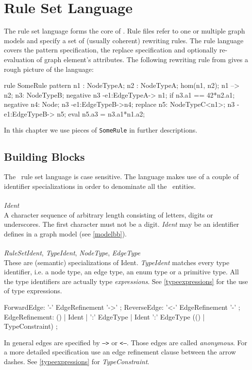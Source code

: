 \chapter{Rule Set Language}

The rule set language forms the core of \GrG. Rule files refer to one or multiple graph models and specify a set of (usually coherent) rewriting rules. The rule language covers the pattern specification, the replace specification and optionally re-evaluation of graph element's attributes. The following rewriting rule from \cite{geiss} gives a rough picture of the language:
\begin{grgen}
rule SomeRule{
  pattern {
    n1 : NodeTypeA;
    n2 : NodeTypeA;
    hom(n1, n2);
    n1 --> n2;
    n3: NodeTypeB;
    negative {
      n3 -e1:EdgeTypeA-> n1;
      if {n3.a1 == 42*n2.a1;}
    }
    negative {
      n4: Node\NodeTypeB;
      n3 -e1:EdgeTypeB->n4;
    }
  }
  replace {
    n5: NodeTypeC<n1>;
    n3 -e1:EdgeTypeB-> n5;
    eval {
      n5.a3 = n3.a1*n1.a2;
    }
  }  
}
\end{grgen}
In this chapter we use pieces of \texttt{SomeRule} in further descriptions.

\section{Building Blocks}
\label{rulebb}

The \GrG\ rule set language is case sensitive. The language makes use of a couple of identifier specializations in order to denominate all the \GrG\ entities.\\
\\
\emph{Ident}\\ \nopagebreak
A character sequence of arbitrary length consisting of letters, digits or underscores. The first character must not be a digit. \emph{Ident} may be an identifier defines in a graph model (see \ref{modelbb}).\\
\\
\emph{RuleSetIdent}, \emph{TypeIdent}, \emph{NodeType}, \emph{EdgeType}\\
These are (semantic) specializations of Ident. \emph{TypeIdent} matches every type identifier, i.e. a node type, an edge type, an enum type or a primitive type. All the type identifiers are actually type \emph{expressions}. See \ref{typeexpressions} for the use of type expressions.\\

\begin{rail}
  ForwardEdge: '-' EdgeRefinement '->' ;
  ReverseEdge: '<-' EdgeRefinement '-' ;  
  EdgeRefinement: () | Ident | ':' EdgeType | Ident ':' EdgeType (() | TypeConstraint) ;
\end{rail}
In general edges are specified by \texttt{-->} or \texttt{<--}. Those edges are called \emph{anonymous}. For a more detailed specification use an edge refinement clause between the arrow dashes. See \ref{typeexpressions} for \emph{TypeConstraint}.

